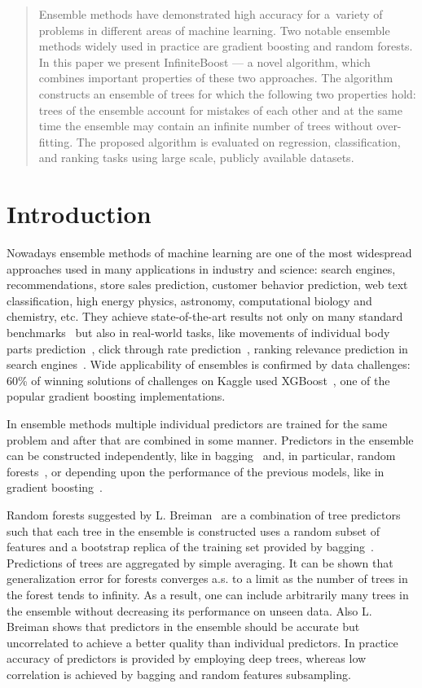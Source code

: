 \begin{abstract}
    Ensemble methods have demonstrated high accuracy for a~variety of problems in different areas of machine learning.
    Two notable ensemble methods widely used in practice are gradient boosting and random forests.
    In this paper we present InfiniteBoost --- a novel algorithm, which combines important properties of these two approaches. 
    The algorithm constructs an ensemble of trees for which the following two properties hold: 
    trees of the ensemble account for mistakes of each other and at the same time the ensemble may contain an infinite number of trees without over-fitting.
    The proposed algorithm is evaluated on regression, classification, and ranking tasks using large scale, publicly available datasets.
\end{abstract}

\section{Introduction}

Nowadays ensemble methods of machine learning are one of the most widespread approaches used in many applications in industry and science:
search engines, recommendations, store sales prediction, customer behavior prediction, web text classification, high energy physics, astronomy, computational biology and chemistry, etc.
They achieve state-of-the-art results not only on many standard benchmarks~\cite{key-benchmarks,key-benchmarks-forest} but also in real-world tasks, like movements of individual body parts prediction~\cite{key-kinect}, click through rate prediction~\cite{key-facebook}, ranking relevance prediction in search engines~\cite{key-yahoo}. 
Wide applicability of ensembles is confirmed by data challenges: 60\% of winning solutions of challenges on Kaggle used XGBoost~\cite{key-xgboost}, one of the popular gradient boosting implementations. 

In ensemble methods multiple individual predictors are trained for the same problem and after that are combined in some manner.
Predictors in the ensemble can be constructed independently, like in bagging~\cite{key-bagging} and, in particular, random forests~\cite{key-random-forest}, or depending upon the performance of the previous models, like in gradient boosting~\cite{key-gb}.

Random forests suggested by L. Breiman~\cite{key-random-forest} are a combination of tree predictors such that each tree in the ensemble is constructed uses a random subset of features and a bootstrap replica of the training set provided by bagging~\cite{key-bagging}.
Predictions of trees are aggregated by simple averaging.
It can be shown that generalization error for forests converges a.s. to a limit as the number of trees in the forest tends to infinity.
As a result, one can include arbitrarily many trees in the ensemble without decreasing its performance on unseen data.
Also L. Breiman shows that predictors in the ensemble should be accurate but uncorrelated to achieve a better quality than individual predictors. 
In practice accuracy of predictors is provided by employing deep trees, whereas low correlation is achieved by bagging and random features subsampling.

